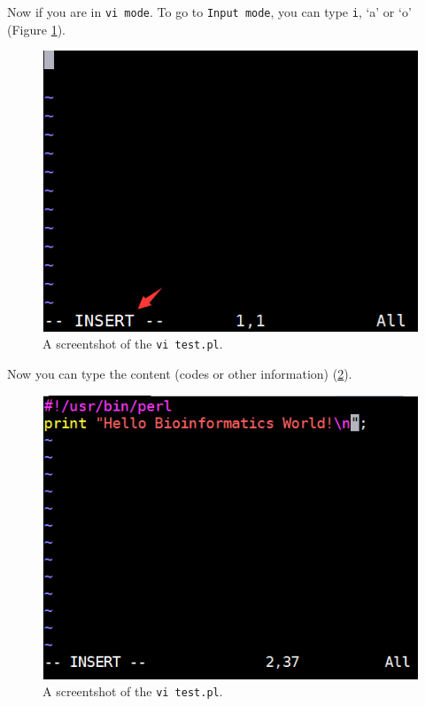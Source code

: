 \documentclass[]{book}
\begin{document}
Now if you are in \texttt{vi\ mode}. To go to \texttt{Input\ mode}, you can type \texttt{i}, `a' or `o' (Figure \ref{fig:ViInpuMode}).



\begin{figure}

{\centering \includegraphics[width=1\linewidth]{images/vi_input_mode} 

}

\caption{A screentshot of the \texttt{vi\ test.pl}.}\label{fig:ViInpuMode}
\end{figure}

Now you can type the content (codes or other information) (\ref{fig:ViInpuType}).



\begin{figure}

{\centering \includegraphics[width=1\linewidth]{images/vi_input_type} 

}

\caption{A screentshot of the \texttt{vi\ test.pl}.}\label{fig:ViInpuType}
\end{figure}
\end{document}
